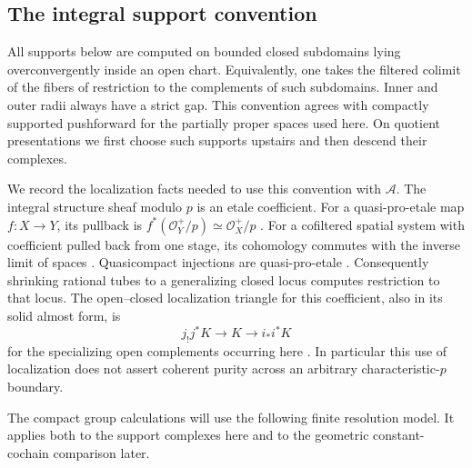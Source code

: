 \subsection{The integral support convention}

All supports below are computed on bounded closed subdomains lying
overconvergently inside an open chart.  Equivalently, one takes the
filtered colimit of the fibers of restriction to the complements of
such subdomains.  Inner and outer radii always have a strict gap.
This convention agrees with compactly supported pushforward for the
partially proper spaces used here.  On quotient presentations we
first choose such supports upstairs and then descend their complexes.

We record the localization facts needed to use this convention with
$\mathscr A$.  The integral structure sheaf modulo $p$ is an etale
coefficient.  For a quasi-pro-etale map $f:X\to Y$, its pullback is
$f^*(\mathcal O_Y^+/p)\simeq\mathcal O_X^+/p$
\cite[Proposition~2.1.2 and the proof of Lemma~2.1.3]{PignonYwanne}.
For a cofiltered spatial system with coefficient pulled back from
one stage, its cohomology commutes with the inverse limit of spaces
\cite[Proposition~14.9]{ScholzeDiamonds}.  Quasicompact injections
are quasi-pro-etale \cite[Corollary~10.6]{ScholzeDiamonds}.
Consequently shrinking rational tubes to a generalizing closed
locus computes restriction to that locus.  The open--closed
localization triangle for this coefficient, also in its solid almost
form, is
\begin{equation}\label{support:localization}
 j_!j^*K\longrightarrow K\longrightarrow i_*i^*K
\end{equation}
for the specializing open complements occurring here
\cite[Corollary~3.2.4 and Proposition~4.3.1]{PignonYwanne}.
In particular this use of localization does not assert coherent
purity across an arbitrary characteristic-$p$ boundary.

The compact group calculations will use the following finite
resolution model.  It applies both to the support complexes here
and to the geometric constant-cochain comparison later.

